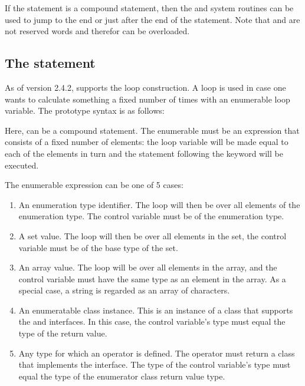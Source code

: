 If the statement is a compound statement, then the  and
 system routines can be used to jump to the end or just
after the end of the  statement. Note that  and
 are not reserved words and therefor can be overloaded.

\subsection{The  statement}
As of version 2.4.2, \fpc supports the  loop construction. A
 loop is used in case one wants to calculate something a fixed number of times
with an enumerable loop variable. The prototype syntax is as follows:

Here,  can be a compound statement. The enumerable must be an
expression that consists of a fixed number of elements: the loop variable
will be made equal to each of the elements in turn and the statement following the
 keyword will be executed.

The enumerable expression can be one of 5 cases:
\begin{enumerate}
\item An enumeration type identifier. The loop will then be over all
elements of the enumeration type. The control variable must be of the
enumeration type.
\item A set value. The loop will then be over all elements in the set, the
control variable must be of the base type of the set.
\item An array value. The loop will be over all elements in the array, and
the control variable must have the same type as an element in the array.
As a special case, a string is regarded as an array of characters.
\item An enumeratable class instance. This is an instance of a class that
supports the  and  interfaces. 
In this case, the control variable's type must equal the type of the 
 return value.
\item Any type for which an  operator is defined. The
 operator must return a class that implements the
 interface. The type of the control variable's type 
must equal the type of the enumerator class  return 
value type.
\end{enumerate}


